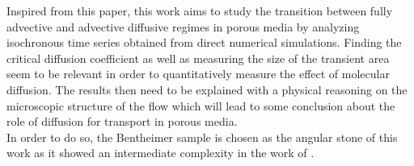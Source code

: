 Inspired from this paper, this work aims to study the transition between fully advective and advective diffusive regimes in porous media by analyzing isochronous time series obtained from direct numerical simulations. 
Finding the critical diffusion coefficient as well as measuring the size of the transient area seem to be relevant in order to quantitatively measure the effect of molecular diffusion.
The results then need to be explained with a physical reasoning on the microscopic structure of the flow which will lead to some conclusion about the role of diffusion for transport in porous media.\\
In order to do so, the Bentheimer sample is chosen as the angular stone of this work as it showed an intermediate complexity in the work of \citet{Meyer2016}.